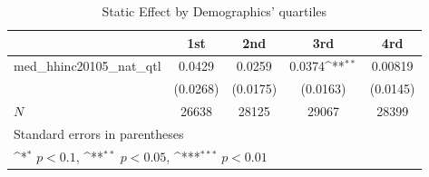 \begin{table}[htbp]\centering
\def\sym#1{\ifmmode^{#1}\else\(^{#1}\)\fi}
\caption{Static Effect by Demographics' quartiles}
\begin{tabular}{l*{4}{c}}
\hline\hline
            &\multicolumn{1}{c}{1st}&\multicolumn{1}{c}{2nd}&\multicolumn{1}{c}{3rd}&\multicolumn{1}{c}{4rd}\\
\hline
med\_hhinc20105\_nat\_qtl&      0.0429         &      0.0259         &      0.0374\sym{**} &     0.00819         \\
            &    (0.0268)         &    (0.0175)         &    (0.0163)         &    (0.0145)         \\
\hline
\(N\)       &       26638         &       28125         &       29067         &       28399         \\
\hline\hline
\multicolumn{5}{l}{\footnotesize Standard errors in parentheses}\\
\multicolumn{5}{l}{\footnotesize \sym{*} \(p<0.1\), \sym{**} \(p<0.05\), \sym{***} \(p<0.01\)}\\
\end{tabular}
\end{table}
